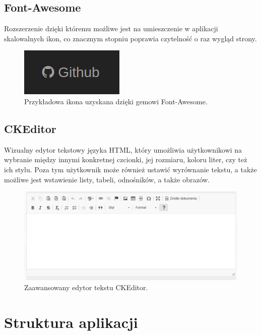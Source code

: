 \documentclass[brudnopis]{xmgr}
\begin{document}
\subsection{Font-Awesome}

Rozszerzenie dzięki któremu możliwe jest na umieszczenie w aplikacji skalowalnych ikon, co znacznym stopniu poprawia czytelność o raz wygląd strony.

\begin{figure}[!tbh]
\centering
\includegraphics[scale=0.5]{fig/icon}
\caption{Przykładowa ikona uzyskana dzięki gemowi Font-Awesome.}
\end{figure}


\subsection{CKEditor}

Wizualny edytor tekstowy języka HTML, który umożliwia użytkownikowi na wybranie między innymi konkretnej
czcionki, jej rozmiaru, koloru liter, czy też ich stylu. Poza tym użytkownik może również ustawić wyrównanie tekstu,
a także możliwe jest wstawienie listy, tabeli, odnośników, a także obrazów.

\begin{figure}[!tbh]
\centering
\includegraphics[width=\linewidth]{fig/ckeditor}
\caption{Zaawansowany edytor tekstu CKEditor.}
\end{figure}

\newpage

\section{Struktura aplikacji}
\end{document}
